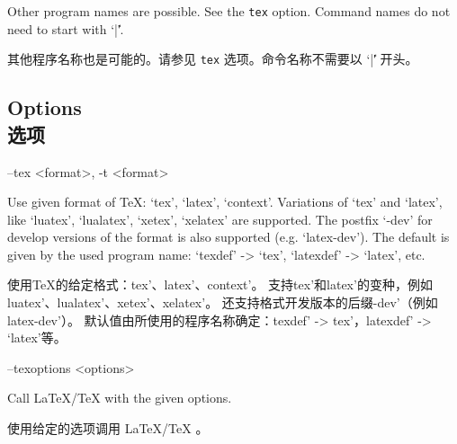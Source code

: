 \documentclass{article}
\newenvironment{options}{%
    \def\cstart{\begingroup\ttfamily\par\noindent\ignorespaces}%
    \def\csep{\endgroup\begingroup\list {}{}\item \relax}%
    \def\cend{\endlist\par\medskip\endgroup\cstart}%
    \cstart
}{%
    \endgroup
}
\begin{document}

Other program names are possible. See the \texttt{tex} option.  Command names do not need to start with `|\|'.

其他程序名称也是可能的。请参见 \texttt{tex} 选项。命令名称不需要以 `|\|' 开头。


\subsection*{Options\\选项}

\begin{parcolumns}[rulebetween=true,colwidths={2=.6\linewidth}]{2}
\end{parcolumns}


\par\medskip  

\begin{options}
--tex \MacroArgs<format>, -t \MacroArgs<format>    \csep Use given format of TeX: `tex', `latex', `context'.
Variations of `tex' and `latex', like `luatex', `lualatex', `xetex', `xelatex' are supported.
The postfix `-dev' for develop versions of the format is also supported (e.g. `latex-dev').
The default is given by the used program name: `texdef' -> `tex', `latexdef' -> `latex', etc.

使用TeX的给定格式：tex'、latex'、context'。 支持tex'和latex'的变种，例如luatex'、lualatex'、xetex'、xelatex'。 还支持格式开发版本的后缀-dev'（例如latex-dev'）。 默认值由所使用的程序名称确定：texdef' -> tex'，latexdef' -> `latex'等。
\cend
\end{options}


\begin{options}
--texoptions \MacroArgs<options>                   

\csep Call \LaTeX/\TeX{} with the given options.

使用给定的选项调用 \LaTeX/\TeX{} 。
\cend
\end{options}
\end{document}
